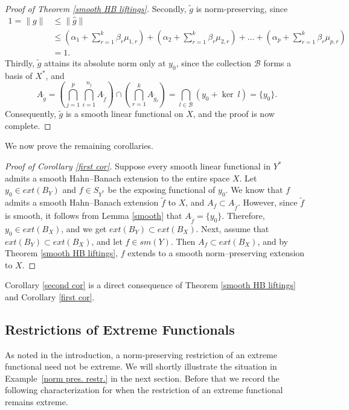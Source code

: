 \documentclass{amsart}
\theoremstyle{definition}
\theoremstyle{remark}
\numberwithin{equation}{section}
\begin{document}
\begin{proof}[Proof of Theorem \ref{smooth HB liftings}]
\noindent Secondly, $\widetilde{g}$ is norm-preserving, since
\begin{align*}
1 =\|g\| & \leq \|\widehat{g}\|\\& \leq (\alpha_1+\sum_{r=1}^{k}\beta_{r}\mu_{1,r})+(\alpha_2+\sum_{r=1}^{k}\beta_{r}\mu_{2,r})+\dots+(\alpha_p+\sum_{r=1}^{k}\beta_{r}\mu_{p,r})\\
& =1.
\end{align*}
Thirdly, $\widetilde{g}$ attains its absolute norm only at $y_0$, since the collection $\mathcal{B}$ forms a basis of $X^*$, and
\[
A_{\widetilde{g}}=(\bigcap_{j=1}^{p}\bigcap_{i=1}^{n_j}A_{\widetilde{f}})\cap (\bigcap_{r=1}^{k}A_{\widetilde{g}_{r}}) = \bigcap_{l\in \mathcal{B}} (y_0+\ker~l)=\{y_0\}.
\]
Consequently, $\widetilde{g}$ is a smooth linear functional on $X$, and the proof is now complete.
\end{proof}

\noindent We now prove the remaining corollaries.

\begin{proof}[Proof of Corollary \ref{first cor}]
Suppose every smooth linear functional in $Y^*$ admits a smooth Hahn--Banach extension to the entire space $X$. Let $y_0\in ext(B_Y)$ and $f\in S_{Y^*}$ be the exposing functional of $y_0$. We know that $f$ admits a smooth Hahn--Banach extension $\widetilde{f}$ to $X$, and $A_f\subset A_{\widetilde{f}}$. However, since $\widetilde{f}$ is smooth, it follows from Lemma \ref{smooth} that $A_{\widetilde{f}}=\{y_0\}$. Therefore, $y_0\in ext(B_X)$, and we get $ext(B_Y)\subset ext(B_X)$. Next, assume that $ext(B_Y)\subset ext(B_X)$, and let $f\in sm(Y)$. Then $A_f\subset ext(B_X)$, and by Theorem \ref{smooth HB liftings}, $f$ extends to a smooth norm--preserving extension to $X$.
\end{proof}

\noindent Corollary \ref{second cor} is a direct consequence of Theorem \ref{smooth HB liftings} and Corollary \ref{first cor}.




\subsection{Restrictions of Extreme Functionals}

\noindent As noted in the introduction, a norm-preserving restriction of an extreme functional need not be extreme. We will shortly illustrate the situation in Example~\ref{norm pres. restr.} in the next section. Before that we record the following characterization for when the restriction of an extreme functional remains extreme.
\end{document}

